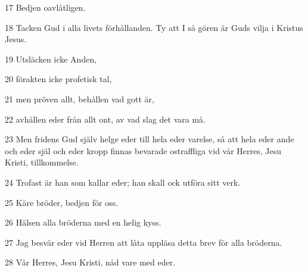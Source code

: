 \par 17 Bedjen oavlåtligen.
\par 18 Tacken Gud i alla livets förhållanden. Ty att I så gören är Guds vilja i Kristus Jesus.
\par 19 Utsläcken icke Anden,
\par 20 förakten icke profetisk tal,
\par 21 men pröven allt, behållen vad gott är,
\par 22 avhållen eder från allt ont, av vad slag det vara må.
\par 23 Men fridens Gud själv helge eder till hela eder varelse, så att hela eder ande och eder själ och eder kropp finnas bevarade ostraffliga vid vår Herres, Jesu Kristi, tillkommelse.
\par 24 Trofast är han som kallar eder; han skall ock utföra sitt verk.
\par 25 Käre bröder, bedjen för oss.
\par 26 Hälsen alla bröderna med en helig kyss.
\par 27 Jag besvär eder vid Herren att låta uppläsa detta brev för alla bröderna.
\par 28 Vår Herres, Jesu Kristi, nåd vare med eder.


